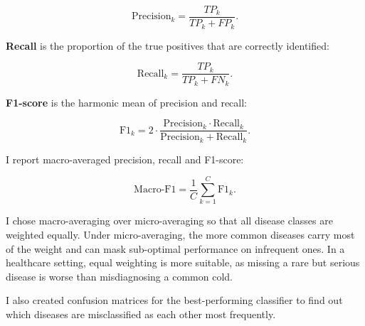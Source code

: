 \begin{equation}
\label{eq:precision}
\text{Precision}_k = \frac{TP_k}{TP_k + FP_k}.
\end{equation}

\textbf{Recall} is the proportion of the true positives that are correctly identified:

\begin{equation}
\label{eq:recall}
\text{Recall}_k = \frac{TP_k}{TP_k + FN_k}.
\end{equation}

\textbf{F1-score} is the harmonic mean of precision and recall:

\begin{equation}
\label{eq:f1}
\text{F1}_k = 2 \cdot \frac{\text{Precision}_k \cdot \text{Recall}_k}{\text{Precision}_k + \text{Recall}_k}.
\end{equation}

I report macro-averaged precision, recall and F1-score:

\begin{equation}
\label{eq:macro}
\text{Macro-F1} = \frac{1}{C} \sum_{k=1}^{C} \text{F1}_k.
\end{equation}

I chose macro-averaging over micro-averaging so that all disease classes are weighted equally. Under micro-averaging, the more common diseases carry most of the weight and can mask sub-optimal performance on infrequent ones. In a healthcare setting, equal weighting is more suitable, as missing a rare but serious disease is worse than misdiagnosing a common cold.

I also created confusion matrices for the best-performing classifier to find out which diseases are misclassified as each other most frequently.
